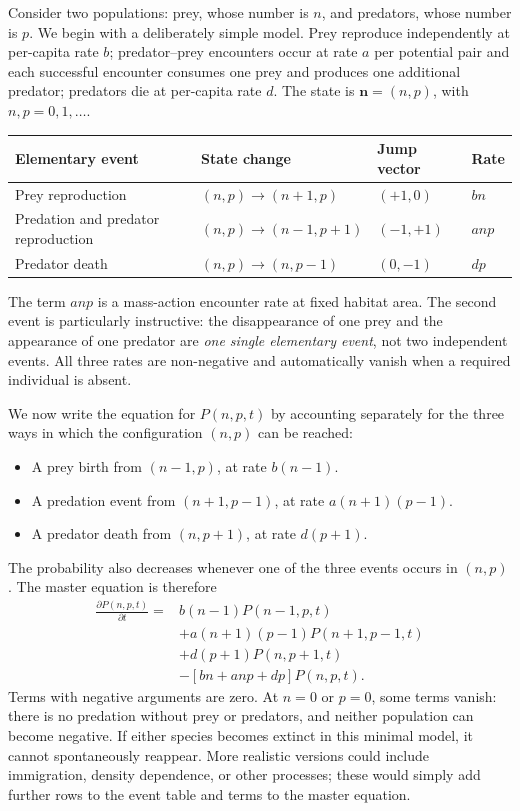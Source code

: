 Consider two populations: prey, whose number is $n$, and predators, whose
number is $p$. We begin with a deliberately simple model. Prey reproduce
independently at per-capita rate $b$; predator--prey encounters occur at
rate $a$ per potential pair and each successful encounter consumes one prey
and produces one additional predator; predators die at per-capita rate $d$.
The state is $\mathbf n=(n,p)$, with $n,p=0,1,\ldots$.

\begin{center}
\begin{tabular}{llll}
\hline
Elementary event & State change & Jump vector & Rate \\
\hline
Prey reproduction & $(n,p)\to(n+1,p)$ & $(+1,0)$ & $bn$ \\
Predation and predator reproduction & $(n,p)\to(n-1,p+1)$ & $(-1,+1)$ & $anp$ \\
Predator death & $(n,p)\to(n,p-1)$ & $(0,-1)$ & $dp$ \\
\hline
\end{tabular}
\end{center}

The term $anp$ is a mass-action encounter rate at fixed habitat area. The
second event is particularly instructive: the disappearance of one prey and
the appearance of one predator are \emph{one single elementary event}, not
two independent events. All three rates are non-negative and automatically
vanish when a required individual is absent.

We now write the equation for $P(n,p,t)$ by accounting separately for the
three ways in which the configuration $(n,p)$ can be reached:
\begin{itemize}
 \item A prey birth from $(n-1,p)$, at rate $b(n-1)$.
 \item A predation event from $(n+1,p-1)$, at rate $a(n+1)(p-1)$.
 \item A predator death from $(n,p+1)$, at rate $d(p+1)$.
\end{itemize}
The probability also decreases whenever one of the three events occurs in
$(n,p)$. The master equation is therefore
\begin{align}
 \frac{\partial P(n,p,t)}{\partial t}={}&
       b(n-1)P(n-1,p,t) \nonumber\\
 &+a(n+1)(p-1)P(n+1,p-1,t) \nonumber\\
 &+d(p+1)P(n,p+1,t) \nonumber\\
 &-[bn+anp+dp]P(n,p,t).
 \label{eq:multi-predator-master}
\end{align}
Terms with negative arguments are zero. At $n=0$ or $p=0$, some terms
vanish: there is no predation without prey or predators, and neither
population can become negative. If either species becomes extinct in this
minimal model, it cannot spontaneously reappear. More realistic versions
could include immigration, density dependence, or other processes; these
would simply add further rows to the event table and terms to the master
equation.

